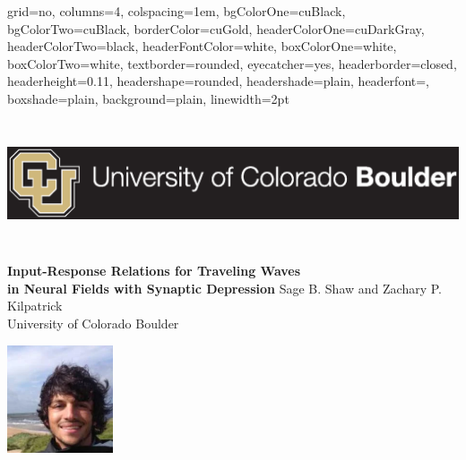 \documentclass[landscape,final]{baposter}
\newcommand{\headshotsize}{1.25in}
\begin{document}
\begin{poster}{
	grid=no,
	columns=4,
	colspacing=1em,
	bgColorOne=cuBlack,
	bgColorTwo=cuBlack,
	borderColor=cuGold,
	headerColorOne=cuDarkGray,
	headerColorTwo=black,
	headerFontColor=white,
	boxColorOne=white,
	boxColorTwo=white,
	textborder=rounded,
	eyecatcher=yes,
	headerborder=closed,
	headerheight=0.11\textheight,
	headershape=rounded,
	headershade=plain,
	headerfont=\Large\textsf, %
	boxshade=plain,
	background=plain,
	linewidth=2pt
}
{{\begin{minipage}{5in}
\includegraphics[height=10em]{cu_logo}
\end{minipage}}} %
{
	\bf \huge
	\color{cuGold}
	Input-Response Relations for Traveling Waves\\in Neural Fields with Synaptic Depression
	\vspace{1mm}
}
{\sc\large 
\color{cuGold}
	Sage B. Shaw and Zachary P. Kilpatrick\\ University of Colorado Boulder
}
{{\begin{minipage}{5in}
\vfill  
\includegraphics[height=\headshotsize]{headshot_zack}

\end{minipage}}}
\end{poster}
\end{document}
